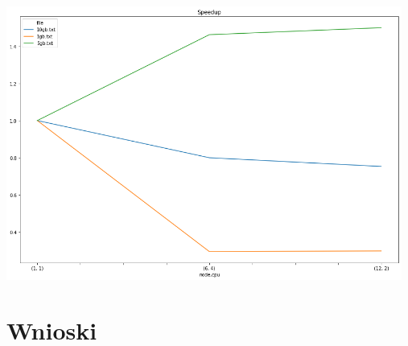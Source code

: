 \documentclass{article}
\begin{document}
        \begin{center}
            \includegraphics[width=13cm]{ex4/report/speedup.png}
        \end{center}

    \section{Wnioski}
\end{document}
